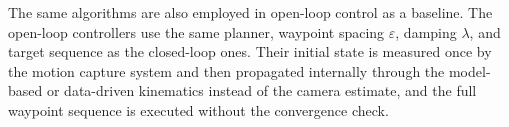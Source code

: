 The same algorithms are also employed in open-loop control as a baseline. The open-loop controllers use the same planner, waypoint spacing $\varepsilon$, damping $\lambda$, and target sequence as the closed-loop ones. Their initial state is measured once by the motion capture system and then propagated internally through the model-based or data-driven kinematics instead of the camera estimate, and the full waypoint sequence is executed without the convergence check.
